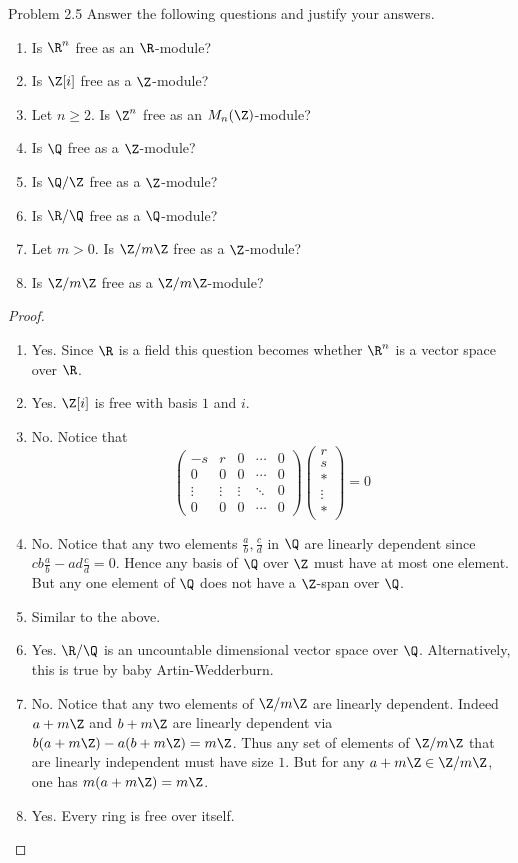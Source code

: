 \documentclass[a4paper]{article}
\begin{document}
\begin{ex}{Problem 2.5}{} Answer the following questions and justify your answers. 
\begin{enumerate}
\item Is $\R^n$ free as an $\R$-module?
\item Is $\Z[i]$ free as a $\Z$-module?
\item Let $n\geq 2$. Is $\Z^n$ free as an $M_n(\Z)$-module?
\item Is $\Q$ free as a $\Z$-module?
\item Is $\Q/\Z$ free as a $\Z$-module?
\item Is $\R/\Q$ free as a $\Q$-module?
\item Let $m>0$. Is $\Z/m\Z$ free as a $\Z$-module?
\item Is $\Z/m\Z$ free as a $\Z/m\Z$-module?
\end{enumerate} 
\begin{proof}~\\
\begin{enumerate}
\item Yes. Since $\R$ is a field this question becomes whether $\R^n$ is a vector space over $\R$. 
\item Yes. $\Z[i]$ is free with basis $1$ and $i$. 

\item No. Notice that $$\begin{pmatrix}
-s & r & 0 & \cdots & 0\\
0 & 0 & 0 & \cdots & 0\\
\vdots & \vdots & \vdots & \ddots & 0\\
0 & 0 & 0 & \cdots & 0
\end{pmatrix}\begin{pmatrix}
r\\s\\\ast\\\vdots\\\ast
\end{pmatrix}=0$$

\item No. Notice that any two elements $\frac{a}{b},\frac{c}{d}$ in $\Q$ are linearly dependent since $cb\frac{a}{b}-ad\frac{c}{d}=0$. Hence any basis of $\Q$ over $\Z$ must have at most one element. But any one element of $\Q$ does not have a $\Z$-span over $\Q$. 
\item Similar to the above. 
\item Yes. $\R/\Q$ is an uncountable dimensional vector space over $\Q$. Alternatively, this is true by baby Artin-Wedderburn. 
\item No. Notice that any two elements of $\Z/m\Z$ are linearly dependent. Indeed $a+m\Z$ and $b+m\Z$ are linearly dependent via $b(a+m\Z)-a(b+m\Z)=m\Z$. Thus any set of elements of $\Z/m\Z$ that are linearly independent must have size $1$. But for any $a+m\Z\in\Z/m\Z$, one has $m(a+m\Z)=m\Z$. 
\item Yes. Every ring is free over itself. 
\end{enumerate}
\end{proof}
\end{ex}
\end{document}

